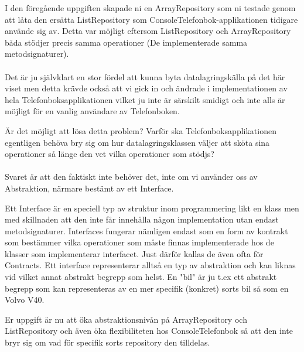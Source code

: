 \documentclass{article}
\begin{document}
I den föregående uppgiften skapade ni en ArrayRepository som ni testade genom att låta den ersätta ListRepository som ConsoleTelefonbok-applikationen tidigare använde sig av. Detta var möjligt eftersom ListRepository och ArrayRepository båda stödjer precis samma operationer (De implementerade samma metodsignaturer).\\ \\
Det är ju självklart en stor fördel att kunna byta datalagringskälla på det här viset men detta krävde också att vi gick in och ändrade i implementationen av hela Telefonboksapplikationen vilket ju inte är särskilt smidigt och inte alls är möjligt för en vanlig användare av Telefonboken.

Är det möjligt att lösa detta problem? Varför ska Telefonboksapplikationen egentligen behöva bry sig om hur datalagringsklassen väljer att sköta sina operationer så länge den vet vilka operationer som stödjs? \\ \\Svaret är att den faktiskt inte behöver det, inte om vi använder oss av Abstraktion, närmare bestämt av ett Interface.

Ett Interface är en speciell typ av struktur inom programmering likt en klass men med skillnaden att den inte får innehålla någon implementation utan endast metodsignaturer. Interfaces fungerar nämligen endast som en form av kontrakt som bestämmer vilka operationer som måste finnas implementerade hos de klasser som implementerar interfacet. Just därför kallas de även ofta för Contracts. Ett interface representerar alltså en typ av abstraktion och kan liknas vid vilket annat abstrakt begrepp som helst. En "bil" är ju t.ex ett abstrakt begrepp som kan representeras av en mer specifik (konkret) sorts bil  så som en Volvo V40.

Er uppgift är nu att öka abstraktionsnivån på ArrayRepository och ListRepository och även öka flexibiliteten hos ConsoleTelefonbok så att den inte bryr sig om vad för specifik sorts repository den tilldelas.
\end{document}

